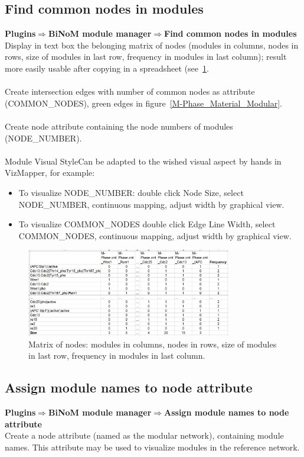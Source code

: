 \subsection{Find common nodes in modules}
\textbf{Plugins$\Rightarrow$BiNoM module manager$\Rightarrow$Find common nodes in modules}\\
Display in text box the belonging matrix of nodes (modules in columns, nodes in rows, size of modules in last row, frequency in modules in last column); result more easily usable after copying in a spreadsheet (see~\ref{Common_nodes_in_modules}.\\\\
Create intersection edges with number of common nodes as attribute (COMMON\_NODES), green edges in figure~\ref{M-Phase_Material_Modular}.\\\\
Create node attribute containing the node numbers of modules (NODE\_NUMBER).\\\\
Module Visual StyleCan be adapted to the wished visual aspect by hands in VizMapper, for example:
\begin{itemize}
\item To visualize NODE\_NUMBER: double click Node Size, select NODE\_NUMBER, continuous mapping, adjust width by graphical view.
\item To visualize COMMON\_NODES double click Edge Line Width, select COMMON\_NODES, continuous mapping, adjust width by graphical view.
\end{itemize}
\begin{figure}
\centering
\includegraphics[width=0.8\textwidth]{graphics/Common_nodes_in_modules}
\caption{Matrix of nodes: modules in columns, nodes in rows, size of modules in last row, frequency in modules in last column.}
\label{Common_nodes_in_modules}
\end{figure}

\subsection{Assign module names to node attribute}
\textbf{Plugins$\Rightarrow$BiNoM module manager$\Rightarrow$Assign module names to node attribute}\\
Create a node attribute (named as the modular network), containing module names. This attribute may be used to visualize modules in the reference network.

